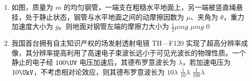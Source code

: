 \documentclass[\gkver]{gaokaozhenti}
\begin{document}
\begin{enumerate}
{

可知机器人在 $0 \textasciitilde{} 1 \Us$ 和 $2 \textasciitilde{} 3 \Us$ 内加速度大小均为 $1 \Umsq$，方向相反，由 $v-t$ 图线的斜率表示加速度可知 A 正确。

故选 A。
}

\item
如图，质量为 $m$ 的均匀钢管，一端支在粗糙水平地面上，另一端被竖直绳悬挂，处于静止状态，钢管与水平地面之间的动摩擦因数为 $\mu$、夹角为 $\theta$，重力加速度大小为 $g$。则地面对钢管左端的摩擦力大小为
{$\frac{1}{2}\mu mg$}
{$\mu mg$}
{$0$}

\item
我国首台拥有自主知识产权的场发射透射电镜 TH—F120 实现了超高分辨率成像，其分辨率提高利用了高速电子束波长远小于可见光波长的物理性质。一个静止的电子经 $100 \UV$ 电压加速后，其德布罗意波长为 $\lambda$，若加速电压为 $10 \UkV$，不考虑相对论效应，则其德布罗意波长为
\fourchoices[answer=C]
{$100\lambda$}
{$10\lambda$}
{$\frac{1}{10}\lambda$}
{$\frac{1}{100}\lambda$}


\end{enumerate}
\end{document}
